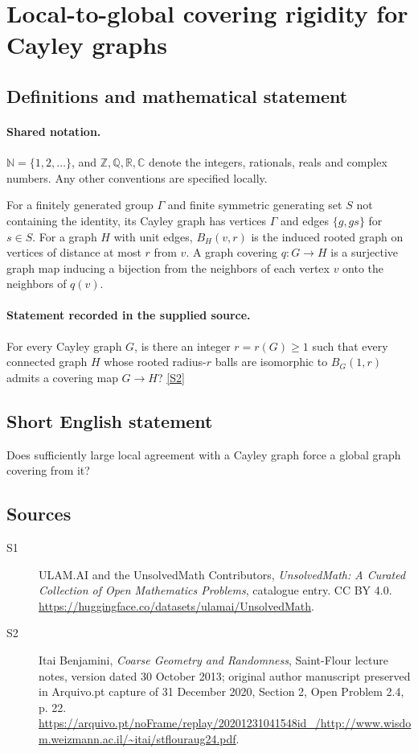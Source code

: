 \documentclass[11pt]{article}
\newcommand{\sref}[2]{\hyperlink{source:#1:#2}{[S#2]}}
\begin{document}
\section{Local-to-global covering rigidity for Cayley graphs}\label{statement}

\subsection{Definitions and mathematical statement}

\paragraph{Shared notation.}$\mathbb N=\{1,2,\ldots\}$, and $\mathbb Z,\mathbb Q,\mathbb R,\mathbb C$ denote the integers, rationals, reals and complex numbers. Any other conventions are specified locally.


For a finitely generated group $\Gamma$ and finite symmetric generating set $S$ not containing the identity, its Cayley graph has vertices $\Gamma$ and edges $\{g,gs\}$ for $s\in S$. For a graph $H$ with unit edges, $B_H(v,r)$ is the induced rooted graph on vertices of distance at most $r$ from $v$. A graph covering $q:G\to H$ is a surjective graph map inducing a bijection from the neighbors of each vertex $v$ onto the neighbors of $q(v)$.
\paragraph{Statement recorded in the supplied source.}
For every Cayley graph $G$, is there an integer $r=r(G)\ge1$ such that every connected graph $H$ whose rooted radius-$r$ balls are isomorphic to $B_G(1,r)$ admits a covering map $G\to H$? \sref{statement}{2}
\subsection{Short English statement}
Does sufficiently large local agreement with a Cayley graph force a global graph covering from it?
\subsection{Sources}
\begin{description}
\item[\hypertarget{source:statement:1}{S1}] ULAM.AI and the UnsolvedMath Contributors, \emph{UnsolvedMath: A Curated Collection of Open Mathematics Problems}, catalogue entry. CC BY 4.0. \url{https://huggingface.co/datasets/ulamai/UnsolvedMath}.
\item[\hypertarget{source:statement:2}{S2}] Itai Benjamini, \emph{Coarse Geometry and Randomness}, Saint-Flour lecture notes, version dated 30 October 2013; original author manuscript preserved in Arquivo.pt capture of 31 December 2020, Section 2, Open Problem 2.4, p. 22. \url{https://arquivo.pt/noFrame/replay/20201231041548id_/http://www.wisdom.weizmann.ac.il/~itai/stflouraug24.pdf}.
\end{description}
\label{end:statement}
\end{document}
